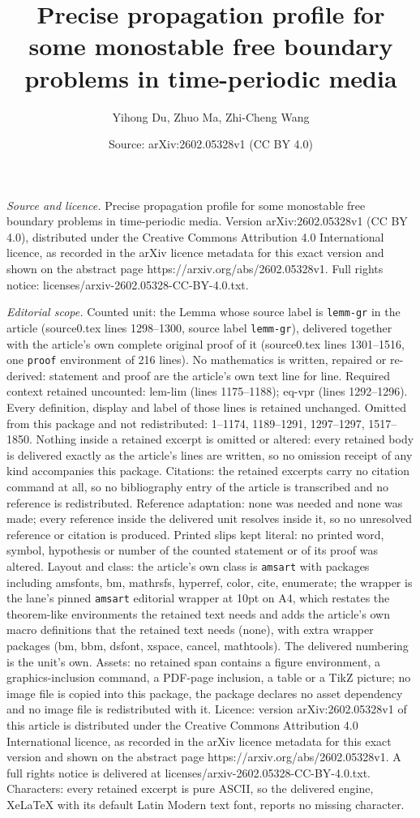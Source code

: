 \documentclass[10pt,a4paper]{amsart}
\title[Precise propagation profile for some monostable free boundar]{Precise propagation profile for some monostable free boundary problems in time-periodic media}
\author{Yihong Du, Zhuo Ma, Zhi-Cheng Wang}
\date{Source: arXiv:2602.05328v1 (CC BY 4.0)}
\begin{document}
\maketitle

\noindent\emph{Source and licence.} Precise propagation profile for some monostable free boundary problems in time-periodic media. Version arXiv:2602.05328v1 (CC BY 4.0), distributed under the Creative Commons Attribution 4.0 International licence, as recorded in the arXiv licence metadata for this exact version and shown on the abstract page https://arxiv.org/abs/2602.05328v1. Full rights notice: licenses/arxiv-2602.05328-CC-BY-4.0.txt.\par\smallskip

\noindent\textit{Editorial scope.} Counted unit: the Lemma whose source label is \texttt{lemm-gr} in the article (source0.tex lines 1298--1300, source label \texttt{lemm-gr}), delivered together with the article's own complete original proof of it (source0.tex lines 1301--1516, one \texttt{proof} environment of 216 lines). No mathematics is written, repaired or re-derived: statement and proof are the article's own text line for line. Required context retained uncounted: lem-lim (lines 1175--1188); eq-vpr (lines 1292--1296). Every definition, display and label of those lines is retained unchanged. Omitted from this package and not redistributed: 1--1174, 1189--1291, 1297--1297, 1517--1850. Nothing inside a retained excerpt is omitted or altered: every retained body is delivered exactly as the article's lines are written, so no omission receipt of any kind accompanies this package. Citations: the retained excerpts carry no citation command at all, so no bibliography entry of the article is transcribed and no reference is redistributed. Reference adaptation: none was needed and none was made; every reference inside the delivered unit resolves inside it, so no unresolved reference or citation is produced. Printed slips kept literal: no printed word, symbol, hypothesis or number of the counted statement or of its proof was altered. Layout and class: the article's own class is \texttt{amsart} with packages including amsfonts, bm, mathrsfs, hyperref, color, cite, enumerate; the wrapper is the lane's pinned \texttt{amsart} editorial wrapper at 10pt on A4, which restates the theorem-like environments the retained text needs and adds the article's own macro definitions that the retained text needs (none), with extra wrapper packages (bm, bbm, dsfont, xspace, cancel, mathtools). The delivered numbering is the unit's own. Assets: no retained span contains a figure environment, a graphics-inclusion command, a PDF-page inclusion, a table or a TikZ picture; no image file is copied into this package, the package declares no asset dependency and no image file is redistributed with it. Licence: version arXiv:2602.05328v1 of this article is distributed under the Creative Commons Attribution 4.0 International licence, as recorded in the arXiv licence metadata for this exact version and shown on the abstract page https://arxiv.org/abs/2602.05328v1. A full rights notice is delivered at licenses/arxiv-2602.05328-CC-BY-4.0.txt. Characters: every retained excerpt is pure ASCII, so the delivered engine, XeLaTeX with its default Latin Modern text font, reports no missing character.
\end{document}

